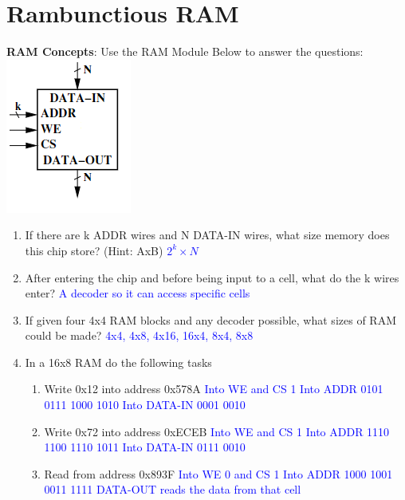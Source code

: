 \documentclass{article}
\begin{document}
\section{Rambunctious RAM}
    \textbf{RAM Concepts}: Use the RAM Module Below to answer the questions:
    \newline
    \includegraphics{figures/RAM.png}
    \begin{enumerate}[label=(\alph*),itemsep = 10pt]
        \item If there are k ADDR wires and N DATA-IN wires, what size memory does this chip store? (Hint: AxB)
        \newline \textcolor{blue}{$2^k \times N$}
        \item After entering the chip and before being input to a cell, what do the k wires enter?
        \newline \textcolor{blue}{A decoder so it can access specific cells}
        \item If given four 4x4 RAM blocks and any decoder possible, what sizes of RAM could be made?
        \newline \textcolor{blue}{4x4, 4x8, 4x16, 16x4, 8x4, 8x8}
        \item In a 16x8 RAM do the following tasks
        \begin{enumerate}[label=(\roman*),itemsep = 10pt]
            \item Write 0x12 into address 0x578A
            \newline \textcolor{blue}{Into WE and CS 1 \newline Into ADDR 0101 0111 1000 1010 \newline Into DATA-IN 0001 0010}
            \item Write 0x72 into address 0xECEB
            \newline \textcolor{blue}{Into WE and CS 1 \newline Into ADDR 1110 1100 1110 1011 \newline Into DATA-IN 0111 0010}
            \item Read from address 0x893F
            \newline \textcolor{blue}{Into WE 0 and CS 1 \newline Into ADDR 1000 1001 0011 1111 \newline DATA-OUT reads the data from that cell}
        \end{enumerate}
    \end{enumerate}
\end{document}
